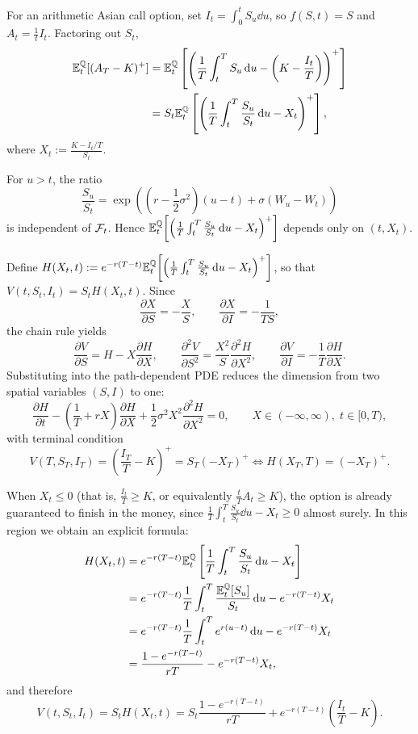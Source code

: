 For an arithmetic Asian call option, set $I_t = \int_0^t S_u \dd u$, so $f(S, t) = S$ and $A_t = \frac{1}{t}I_t$. Factoring out $S_t$,
\[
\begin{aligned}
    \mathbb{E}_t^{\mathbb{Q}}[(A_T - K)^+] &= \mathbb{E}_t^{\mathbb{Q}}\left[\left(\frac{1}{T}\int_t^T S_u \,\mathrm{d} u - \left(K - \frac{I_t}{T}\right)\right)^+\right] \\
                           &= S_t \mathbb{E}_t^{\mathbb{Q}}\left[\left(\frac{1}{T}\int_t^T \frac{S_u}{S_t}\,\mathrm{d} u - X_t\right)^+\right],
\end{aligned}
\]
where $X_t := \frac{K - I_t/T}{S_t}$.

\begin{note}
    For $u > t$, the ratio
    \[
    \frac{S_u}{S_t} = \exp\!\left(\left(r - \frac{1}{2}\sigma^2\right)(u - t) + \sigma(W_u - W_t)\right)
    \]
    is independent of $\mathcal{F}_t$. Hence $\mathbb{E}_t^{\mathbb{Q}}\!\left[\left(\frac{1}{T}\int_t^T \frac{S_u}{S_t}\,\mathrm{d} u - X_t\right)^+\right]$ depends only on $(t, X_t)$.
\end{note}

Define $H(X_t, t) := e^{-r(T-t)}\mathbb{E}_t^{\mathbb{Q}}\!\left[\left(\frac{1}{T}\int_t^T \frac{S_u}{S_t}\,\mathrm{d} u - X_t\right)^+\right]$, so that $V(t, S_t, I_t) = S_t H(X_t, t)$. Since
\[
\frac{\partial X}{\partial S} = -\frac{X}{S}, \qquad \frac{\partial X}{\partial I} = -\frac{1}{T S},
\]
the chain rule yields
\[
\frac{\partial V}{\partial S} = H - X\frac{\partial H}{\partial X}, \qquad \frac{\partial^2 V}{\partial S^2} = \frac{X^2}{S}\frac{\partial^2 H}{\partial X^2}, \qquad \frac{\partial V}{\partial I} = -\frac{1}{T}\frac{\partial H}{\partial X}.
\]
Substituting into the path-dependent PDE reduces the dimension from two spatial variables $(S, I)$ to one:
\[
\frac{\partial H}{\partial t} - \left(\frac{1}{T} + r X\right)\frac{\partial H}{\partial X} + \frac{1}{2}\sigma^2 X^2 \frac{\partial^2 H}{\partial X^2} = 0, \qquad X \in (-\infty, \infty),\; t \in [0, T),
\]
with terminal condition
\[
V(T, S_T, I_T) = \left(\frac{I_T}{T} - K\right)^+ = S_T(-X_T)^+ \iff H(X_T, T) = (-X_T)^+.
\]

When $X_t \le 0$ (that is, $\frac{I_t}{T} \ge K$, or equivalently $\frac{t}{T} A_t \ge K$), the option is already guaranteed to finish in the money, since $\frac{1}{T}\int_t^T \frac{S_u}{S_t}\dd u - X_t \ge 0$ almost surely. In this region we obtain an explicit formula:
\[
\begin{aligned}
    H(X_t, t) &= e^{-r(T-t)}\mathbb{E}_t^{\mathbb{Q}}\left[\frac{1}{T}\int_t^T \frac{S_u}{S_t}\,\mathrm{d} u - X_t\right] \\
              &= e^{-r(T-t)}\frac{1}{T}\int_t^T \frac{\mathbb{E}_t^{\mathbb{Q}}[S_u]}{S_t}\,\mathrm{d} u - e^{-r(T-t)}X_t \\
              &= e^{-r(T-t)}\frac{1}{T}\int_t^T e^{r(u - t)}\,\mathrm{d} u - e^{-r(T-t)}X_t \\
              &= \frac{1 - e^{-r(T-t)}}{r T} - e^{-r(T-t)}X_t,
\end{aligned}
\]
and therefore
\[
V(t, S_t, I_t) = S_t H(X_t, t) = S_t\frac{1 - e^{-r(T-t)}}{r T} + e^{-r(T-t)}\left(\frac{I_t}{T} - K\right).
\]

